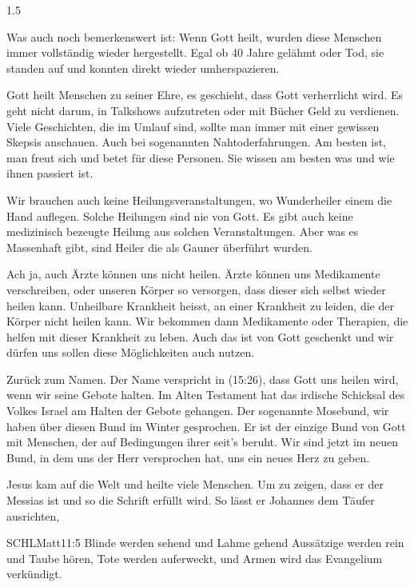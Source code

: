 \documentclass[fontsize=14pt]{../../inc/mybib}
\begin{document}
\begin{spacing}{1.5}
\begin{block}
        Was auch noch bemerkenswert ist: Wenn Gott heilt, wurden diese Menschen immer vollständig wieder hergestellt. Egal ob 40 Jahre gelähmt oder Tod, sie standen auf und konnten direkt wieder umherspazieren.

         Gott heilt Menschen zu seiner Ehre, es geschieht, dass Gott verherrlicht wird. Es geht nicht darum, in Talkshows aufzutreten oder mit Bücher Geld zu verdienen. Viele Geschichten, die im Umlauf sind, sollte man immer mit einer gewissen Skepsis anschauen. Auch bei sogenannten Nahtoderfahrungen. Am besten ist, man freut sich und betet für diese Personen. Sie wissen am besten was und wie ihnen passiert ist. 

        Wir brauchen auch keine Heilungsveranstaltungen, wo Wunderheiler einem die Hand auflegen. Solche Heilungen sind nie von Gott. Es gibt auch keine medizinisch bezeugte Heilung aus solchen Veranstaltungen. Aber was es Massenhaft gibt, sind Heiler die als Gauner überführt wurden.

        Ach ja, auch Ärzte können uns nicht heilen. Ärzte können uns Medikamente verschreiben, oder unseren Körper so versorgen, dass dieser sich selbst wieder heilen kann. Unheilbare Krankheit heisst, an einer Krankheit zu leiden, die der Körper nicht heilen kann. Wir bekommen dann Medikamente oder Therapien, die helfen mit dieser Krankheit zu leben. Auch das ist von Gott geschenkt und wir dürfen uns sollen diese Möglichkeiten auch nutzen. 

        Zurück zum Namen. Der Name verspricht in (15:26), dass Gott uns heilen wird, wenn wir seine Gebote halten. Im Alten Testament hat das irdische Schicksal des Volkes Israel am Halten der Gebote gehangen. Der sogenannte Mosebund, wir haben über diesen Bund im Winter gesprochen. Er ist der einzige Bund von Gott mit Menschen, der auf Bedingungen ihrer seit's beruht. Wir sind jetzt im neuen Bund, in dem uns der Herr versprochen hat, uns ein neues Herz zu geben. 

        Jesus kam auf die Welt und heilte viele Menschen. Um zu zeigen, dass er der Messias ist und so die Schrift erfüllt wird. So lässt er Johannes dem Täufer ausrichten,
        \begin{bibelbox}{SCHL}{Matt}{11:5}
        Blinde werden sehend und Lahme gehend Aussätzige werden rein und Taube hören, Tote werden auferweckt, und Armen wird das Evangelium verkündigt.
        \end{bibelbox}


\end{block}
\end{spacing}
\end{document}
